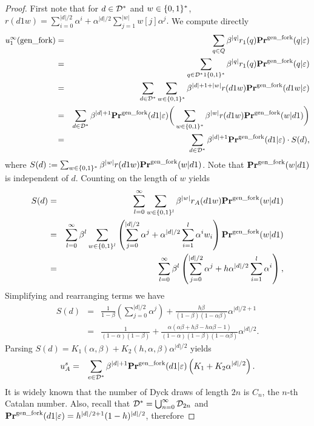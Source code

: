\begin{proof}
	First note that for $d\in \mathcal{D}^\ast$ and $w\in\{0,1\}^\ast$, $r(d1w)=\sum_{i=0}^{|d|/2}\alpha^i + \alpha^{|d|/2}\sum_{j=1}^{|w|}w[j]\alpha^j.$ We compute directly
	\begin{eqnarray*}
		u^\infty_1(\text{\rm gen\_fork})&=& \sum_{q\in Q}\beta^{|q|}r_1(q)\mathbf{Pr}^{\text{\rm gen\_fork}}(q|\varepsilon) \\
    	               &=& \sum_{q\in \mathcal{D}^\ast 1\{0,1\}^\ast } \beta^{|q|}r_1(q)\mathbf{Pr}^{\text{\rm gen\_fork}}(q|\varepsilon) \\
    	               &=& \sum_{d\in \mathcal{D}^\ast}\sum_{w\in\{0,1\}^\ast}\beta^{|d|+1+|w|}r(d1w)\mathbf{Pr}^{\text{\rm gen\_fork}} (d1w|\varepsilon)\\
       	               &=& \sum_{d\in \mathcal{D}^\ast}\beta ^{|d|+1}\mathbf{Pr}^{\text{\rm gen\_fork}} (d1|\varepsilon) \bigg(\sum_{w\in\{0,1\}^\ast}\beta^{|w|}r(d1w)\mathbf{Pr}^{\text{\rm gen\_fork}} (w|d1)\bigg)\\
       	               &=& \sum_{d\in \mathcal{D}^\ast}\beta ^{|d|+1}\mathbf{Pr}^{\text{\rm gen\_fork}} (d1|\varepsilon) \cdot S(d),
	\end{eqnarray*}
where $S(d):=\sum_{w\in \{0,1\}^\ast}\beta^{|w|}r(d1w)\mathbf{Pr}^{\text{\rm gen\_fork}}(w|d1)$. Note that $\mathbf{Pr}^{\text{\rm gen\_fork}}(w|d1)$ is independent of $d$. Counting on the length of $w$ yields 
\begin{eqnarray*}
S(d)      &=& \sum_{l=0}^{\infty}\sum_{w\in \{0,1\}^l}\beta^{|w|}r_A(d1w)\mathbf{Pr}^{\text{\rm gen\_fork}}(w|d1)\\
		  &=& \sum_{l=0}^{\infty}\beta^{l}\sum_{w\in \{0,1\}^l}\left(\sum_{j=0}^{|d|/2}\alpha^j + \alpha^{|d|/2}\sum_{i=1}^{l}\alpha^iw_i\right)\mathbf{Pr}^{\text{\rm gen\_fork}}(w|d1)\\
          &=& \sum_{l=0}^{\infty}\beta^{l}\left(\sum_{j=0}^{|d|/2}\alpha^j + h\alpha^{|d|/2}\sum_{i=1}^{l}\alpha^i\right),
\end{eqnarray*}
Simplifying and rearranging terms we have
\begin{eqnarray*}
S(d)      &=& \frac{1}{1-\beta}\left(\sum_{j=0}^{|d|/2}\alpha^j\right) + \frac{h\beta}{(1-\beta)(1-\alpha\beta)}\alpha^{|d|/2+1}\\
&=& \frac{1}{(1-\alpha)(1-\beta)}+\frac{\alpha(\alpha\beta+h\beta-h\alpha\beta-1)}{(1-\alpha)(1-\beta)(1-\alpha\beta)}\alpha^{|d|/2}.
\end{eqnarray*}
Parsing $S(d)=K_1(\alpha,\beta)+K_2(h,\alpha,\beta)\alpha^{|d|/2}$ yields
\begin{eqnarray*}
u_A^s &=& \sum_{e\in \mathcal{D}^\ast}\beta^{|d|+1}\mathbf{Pr}^{\text{\rm gen\_fork}}(d1|\varepsilon)\left(K_1+K_2\alpha^{|d|/2}\right).
\end{eqnarray*}
It is widely known that the number of Dyck draws of length $2n$ is $C_n$, the $n$-th Catalan number. Also, recall that $\mathcal{D}^\ast = \bigcup_{n=0}^{\infty} \mathcal{D}_{2n}$ and $\mathbf{Pr}^{\text{\rm gen\_fork}}(d1|\varepsilon)=h^{|d|/2+1}(1-h)^{|d|/2}$, therefore

\end{proof}

